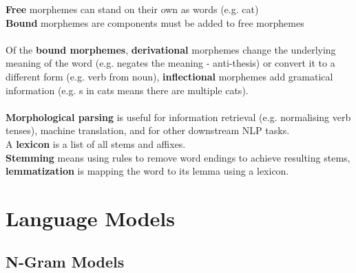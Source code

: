 \documentclass[]{article}
\begin{document}
	\textbf{Free} morphemes can stand on their own as words (e.g. cat) \\
	\textbf{Bound} morphemes are components must be added to free morphemes \\ \\
	
	Of the \textbf{bound morphemes}, \textbf{derivational} morphemes change the underlying meaning of the word (e.g. negates the meaning - anti-thesis) or convert it to a different form (e.g. verb from noun), \textbf{inflectional} morphemes add gramatical information (e.g. s in cats means there are multiple cats). \\ \\
	
	\textbf{Morphological parsing} is useful for information retrieval (e.g. normalising verb tenses), machine translation, and for other downstream NLP tasks. \\
	
	A \textbf{lexicon} is a list of all stems and affixes. \\ 
	
	\textbf{Stemming} means using rules to remove word endings to achieve resulting stems, \textbf{lemmatization} is mapping the word to its lemma using a lexicon. \\
	
	
	\clearpage
	\section{Language Models}
	
	\subsection{N-Gram Models}
	
\end{document}
